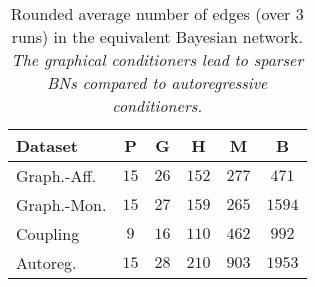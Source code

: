 \begin{table}
    \caption{Rounded average number of edges (over 3 runs) in the equivalent Bayesian network. \textit{The graphical conditioners lead to sparser BNs compared to autoregressive conditioners.}} \label{tab:edges}
    \centering
    \scriptsize
    \setlength{\tabcolsep}{2pt}
    \renewcommand{\arraystretch}{1.5}

    \begin{tabular}{l c c c c c}
        \hline\hline
        Dataset & \textbf{P} & \textbf{G} & \textbf{H} & \textbf{M} & \textbf{B} \\
        \hline
        Graph.-Aff. & $15$   & $26$  & $152$  & $277$  & $471$  \\
        Graph.-Mon. & $15$    & $27$  & $159$  & $265$  & $1594$  \\
        \hline
        Coupling & $9$  & $16$  & $110$  & $462$ & $992$ \\
        Autoreg. & $15$  & $28$  & $210$  & $903$ & $1953$\\
         \hline\hline

    \end{tabular}
\end{table}



